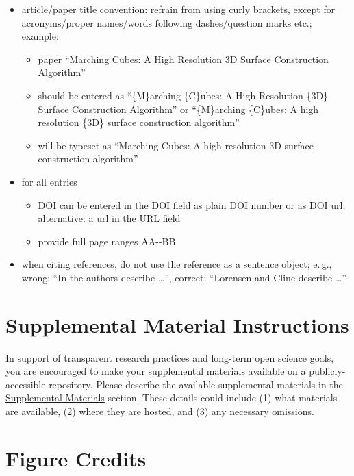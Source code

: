 \documentclass{vgtc}                          %
\begin{document}
\begin{itemize}
\begin{itemize}
  \end{itemize}
\item article/paper title convention: refrain from using curly brackets, except for acronyms/proper names/words following dashes/question marks etc.; example:
\begin{itemize}
	\item paper ``Marching Cubes: A High Resolution 3D Surface Construction Algorithm''
	\item should be entered as ``\{M\}arching \{C\}ubes: A High Resolution \{3D\} Surface Construction Algorithm'' or  ``\{M\}arching \{C\}ubes: A high resolution \{3D\} surface construction algorithm''
	\item will be typeset as ``Marching Cubes: A high resolution 3D surface construction algorithm''
\end{itemize}
\item for all entries
\begin{itemize}
	\item DOI can be entered in the DOI field as plain DOI number or as DOI url; alternative: a url in the URL field
	\item provide full page ranges AA-{}-BB
\end{itemize}
\item when citing references, do not use the reference as a sentence object; e.\,g., wrong: ``In \cite{Lorensen:1987:MCA} the authors describe \dots'', correct: ``Lorensen and Cline \cite{Lorensen:1987:MCA} describe \dots''
\end{itemize}

\section{Supplemental Material Instructions}
\label{sec:supplement_inst}

In support of transparent research practices and long-term open science goals, you are encouraged to make your supplemental materials available on a publicly-accessible repository.
Please describe the available supplemental materials in the \hyperref[sec:supplemental_materials]{Supplemental Materials} section.
These details could include (1) what materials are available, (2) where they are hosted, and (3) any necessary omissions.

\section{Figure Credits}
\label{sec:figure_credits_inst}
\end{document}
